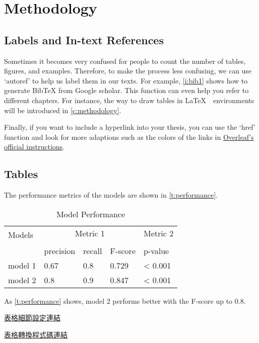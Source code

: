 \chapter{Methodology}
\label{c:methodology}

\section{Labels and In-text References}

Sometimes it becomes very confused for people to count the number of tables, figures, and examples. Therefore, to make the process less confusing, we can use `autoref' to help us label them in our texts. For example, \autoref{i:bib1} shows how to generate BibTeX from Google scholar. %
This function can even help you refer to different chapters. For instance, the way to draw tables in \LaTeX \ \ environments will be introduced in \autoref{c:methodology}. \par

Finally, if you want to include a hyperlink into your thesis, you can use the `href' function and look for more adaptions such as the colors of the links in \href{https://www.overleaf.com/learn/latex/Hyperlinks}{Overleaf's official instructions}.

\section{Tables}

The performance metrics of the models are shown in \autoref{t:performance}. \par


\begin{table}[h]
    \centering
    \caption{Model Performance} %
    \label{t:performance} %
    \begin{tabular}{lllll}
        \toprule
        \multirow{2}{*}[-1em]{Models} & \multicolumn{3}{c}{Metric 1} & Metric 2\\
        \cmidrule{2-4} \cmidrule{5-5} \\
        {} & precision & recall & F-score  & p-value \\
        \midrule
        model 1 & 0.67  & 0.8 & 0.729  & < 0.001 \\
        model 2 & 0.8 & 0.9 & 0.847 & < 0.001 \\
        \bottomrule
    \end{tabular}
\end{table}

As \autoref{t:performance} shows, model 2 performs better with the F-score up to 0.8.

\href{https://jdhao.github.io/2019/08/27/latex_table_with_booktabs/}{表格細節設定連結}\par
\href{https://www.tablesgenerator.com/}{表格轉換程式碼連結}
